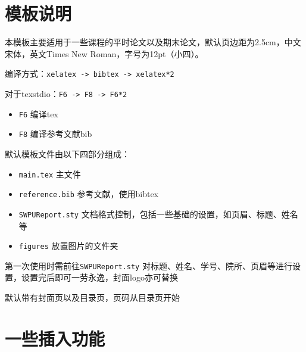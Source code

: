 \documentclass[12pt,hyperref,a4paper,UTF8]{ctexart}
\begin{document}
\cover
\groupcover
%
%

\thispagestyle{empty} %

\newpage
\tableofcontents

\newpage


\section{模板说明}
本模板主要适用于一些课程的平时论文以及期末论文，默认页边距为2.5cm，中文宋体，英文Times New Roman，字号为12pt（小四）。

编译方式：\verb|xelatex -> bibtex -> xelatex*2|

对于texstdio：\verb|F6 -> F8 -> F6*2|

\begin{itemize}[leftmargin=*,labelsep=5.8mm,labelindent=\parindent]
	\item \texttt{F6} 编译tex
	\item \texttt{F8} 编译参考文献bib
\end{itemize}

默认模板文件由以下四部分组成：
\begin{itemize}
    \item \texttt{main.tex} 主文件
    \item \texttt{reference.bib} 参考文献，使用bibtex
    \item \texttt{SWPUReport.sty} 文档格式控制，包括一些基础的设置，如页眉、标题、姓名等
    \item \texttt{figures} 放置图片的文件夹
\end{itemize}

第一次使用时需前往\texttt{SWPUReport.sty} 对标题、姓名、学号、院所、页眉等进行设置，设置完后即可一劳永逸，封面logo亦可替换

默认带有封面页以及目录页，页码从目录页开始

\section{一些插入功能}
\end{document}
